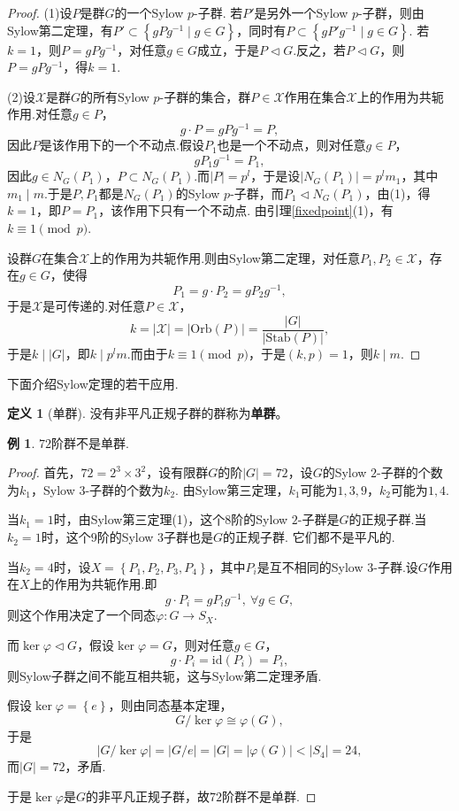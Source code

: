 \documentclass[12pt]{ctexart}
\theoremstyle{definition}
\newtheorem{definition}{定义}[section]
\newtheorem{example}{例}[section]
\theoremstyle{plain}
\newcommand{\id}{\mathrm{id}}
\newcommand{\Orb}{\mathrm{Orb}}
\newcommand{\Stab}{\mathrm{Stab}}
\begin{document}
\begin{proof}
	(1)设$P$是群$G$的一个Sylow $p$-子群. 若$P'$是另外一个Sylow $p$-子群，则由Sylow第二定理，有$P'\subset\left\{gPg^{-1}\mid g\in G\right\}$，同时有$P\subset\left\{gP'g^{-1}\mid g\in G\right\}$. 若$k=1$，则$P=gPg^{-1}$，对任意$g\in G$成立，于是$P\lhd G$.反之，若$P\lhd G$，则$P=gPg^{-1}$，得$k=1$.
	
	(2)设$\mathcal{X}$是群$G$的所有Sylow $p$-子群的集合，群$P\in\mathcal{X}$作用在集合$\mathcal{X}$上的作用为共轭作用.对任意$g\in P$，
	$$g\cdot P=gPg^{-1}=P,$$
	因此$P$是该作用下的一个不动点.假设$P_1$也是一个不动点，则对任意$g\in P$，
	$$gP_1g^{-1}=P_1,$$
	因此$g\in N_G(P_1)$，$P\subset N_G(P_1)$.而$|P|=p^l$，于是设$|N_G(P_1)|=p^lm_1$，其中$m_1\mid m$.于是$P,P_1$都是$N_G(P_1)$的Sylow $p$-子群，而$P_1\lhd N_G(P_1)$，由(1)，得$k=1$，即$P=P_1$，该作用下只有一个不动点. 由引理\ref{fixedpoint}(1)，有$k\equiv 1\pmod p$.
	
	设群$G$在集合$\mathcal{X}$上的作用为共轭作用.则由Sylow第二定理，对任意$P_1,P_2\in\mathcal{X}$，存在$g\in G$，使得
	$$P_1=g\cdot P_2=gP_2g^{-1},$$
	于是$\mathcal{X}$是可传递的.对任意$P\in\mathcal{X}$，
	$$k=|\mathcal{X}|=|\Orb(P)|=\frac{|G|}{|\Stab(P)|},$$
	于是$k\mid|G|$，即$k\mid p^lm$.而由于$k\equiv 1\pmod p$，于是$(k,p)=1$，则$k\mid m$.
\end{proof}
下面介绍Sylow定理的若干应用.
\begin{definition}[单群]
	没有非平凡正规子群的群称为\textbf{单群}。
\end{definition}
\begin{example}
	$72$阶群不是单群.
\end{example}
\begin{proof}
	首先，$72=2^3\times3^2$，设有限群$G$的阶$|G|=72$，设$G$的Sylow $2$-子群的个数为$k_1$，Sylow $3$-子群的个数为$k_2$. 由Sylow第三定理，$k_1$可能为$1,3,9$，$k_2$可能为$1,4$.
	
	当$k_1=1$时，由Sylow第三定理(1)，这个$8$阶的Sylow $2$-子群是$G$的正规子群.当$k_2=1$时，这个$9$阶的Sylow $3$子群也是$G$的正规子群. 它们都不是平凡的.
	
	当$k_2=4$时，设$X=\left\{P_1,P_2,P_3,P_4\right\}$，其中$P_i$是互不相同的Sylow $3$-子群.设$G$作用在$X$上的作用为共轭作用.即
	$$g\cdot P_i=gP_ig^{-1},\ \forall g\in G,$$
	则这个作用决定了一个同态$\varphi:G\to S_X$.
	
	而$\ker\varphi\lhd G$，假设$\ker\varphi=G$，则对任意$g\in G$，
	$$g\cdot P_i=\id(P_i)=P_i,$$
	则Sylow子群之间不能互相共轭，这与Sylow第二定理矛盾.
	
	假设$\ker\varphi=\left\{e\right\}$，则由同态基本定理，
	$$G/\ker\varphi\cong\varphi(G),$$
	于是
	$$|G/\ker\varphi|=|G/e|=|G|=|\varphi(G)|<|S_4|=24,$$
	而$|G|=72$，矛盾.
	
	于是$\ker\varphi$是$G$的非平凡正规子群，故$72$阶群不是单群.
\end{proof}
\end{document}
